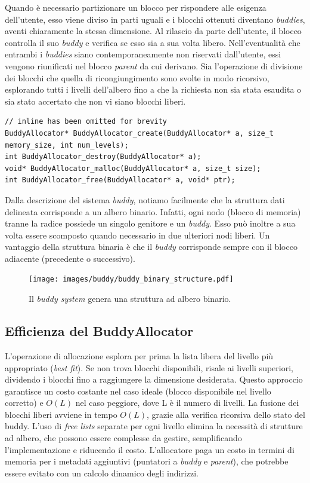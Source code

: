 Quando è necessario partizionare un blocco per rispondere alle esigenza dell'utente, esso viene diviso in parti uguali e i blocchi ottenuti diventano \textit{buddies}, aventi chiaramente la stessa dimensione. Al rilascio da parte dell’utente, il blocco controlla il suo \textit{buddy} e verifica se esso sia a sua volta libero.
Nell’eventualità che entrambi i \textit{buddies} siano contemporaneamente non riservati dall’utente, essi vengono riunificati nel blocco \textit{parent} da cui derivano. Sia l'operazione di divisione dei blocchi che quella di ricongiungimento sono svolte in modo ricorsivo, esplorando tutti i livelli dell'albero fino a che la richiesta non sia stata esaudita o sia stato accertato che non vi siano blocchi liberi. 

\begin{lstlisting}
// inline has been omitted for brevity
BuddyAllocator* BuddyAllocator_create(BuddyAllocator* a, size_t memory_size, int num_levels);
int BuddyAllocator_destroy(BuddyAllocator* a);
void* BuddyAllocator_malloc(BuddyAllocator* a, size_t size);
int BuddyAllocator_free(BuddyAllocator* a, void* ptr);
\end{lstlisting}

Dalla descrizione del sistema \textit{buddy}, notiamo facilmente che la struttura dati delineata corrisponde a un albero binario. Infatti, ogni nodo (blocco di memoria) tranne la radice possiede un singolo genitore e un \textit{buddy}. Esso può inoltre a sua volta essere scomposto quando necessario in due ulteriori nodi liberi. Un vantaggio della struttura binaria è che il \textit{buddy} corrisponde sempre con il blocco adiacente (precedente o successivo).

\begin{figure}[H]
    \centering
    \texttt{[image: images/buddy/buddy\_binary\_structure.pdf]}
    \caption{Il \textit{buddy system} genera una struttura ad albero binario. }
    \label{fig:buddy_binary_structure}
\end{figure}


\subsection*{Efficienza del BuddyAllocator}
L'operazione di allocazione esplora per prima la lista libera del livello più appropriato (\textit{best fit}). Se non trova blocchi disponibili, risale ai livelli superiori, dividendo i blocchi fino a raggiungere la dimensione desiderata. Questo approccio garantisce un costo costante nel caso ideale (blocco disponibile nel livello corretto) e $O(L)$ nel caso peggiore, dove L è il numero di livelli. La fusione dei blocchi liberi avviene in tempo $O(L)$, grazie alla verifica ricorsiva dello stato del buddy. 
L'uso di \textit{free lists} separate per ogni livello elimina la necessità di strutture ad albero, che possono essere complesse da gestire, semplificando l'implementazione e riducendo il costo. L'allocatore paga un costo in termini di memoria per i metadati aggiuntivi (puntatori a \textit{buddy} e \textit{parent}), che potrebbe essere evitato con un calcolo dinamico degli indirizzi. 

